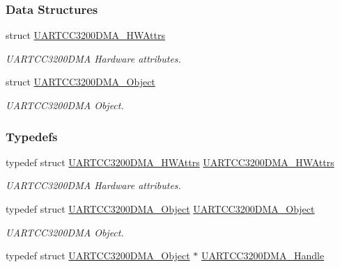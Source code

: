\subsubsection*{Data Structures}
\begin{DoxyCompactItemize}
\item 
struct \hyperlink{struct_u_a_r_t_c_c3200_d_m_a___h_w_attrs}{U\+A\+R\+T\+C\+C3200\+D\+M\+A\+\_\+\+H\+W\+Attrs}
\begin{DoxyCompactList}\small\item\em U\+A\+R\+T\+C\+C3200\+D\+M\+A Hardware attributes. \end{DoxyCompactList}\item 
struct \hyperlink{struct_u_a_r_t_c_c3200_d_m_a___object}{U\+A\+R\+T\+C\+C3200\+D\+M\+A\+\_\+\+Object}
\begin{DoxyCompactList}\small\item\em U\+A\+R\+T\+C\+C3200\+D\+M\+A Object. \end{DoxyCompactList}\end{DoxyCompactItemize}
\subsubsection*{Typedefs}
\begin{DoxyCompactItemize}
\item 
typedef struct \hyperlink{struct_u_a_r_t_c_c3200_d_m_a___h_w_attrs}{U\+A\+R\+T\+C\+C3200\+D\+M\+A\+\_\+\+H\+W\+Attrs} \hyperlink{_u_a_r_t_c_c3200_d_m_a_8h_a288a7e8d5d3c9cd0a6648e68bc375d47}{U\+A\+R\+T\+C\+C3200\+D\+M\+A\+\_\+\+H\+W\+Attrs}
\begin{DoxyCompactList}\small\item\em U\+A\+R\+T\+C\+C3200\+D\+M\+A Hardware attributes. \end{DoxyCompactList}\item 
typedef struct \hyperlink{struct_u_a_r_t_c_c3200_d_m_a___object}{U\+A\+R\+T\+C\+C3200\+D\+M\+A\+\_\+\+Object} \hyperlink{_u_a_r_t_c_c3200_d_m_a_8h_a44a53cd72c6cfa88e7d4a380d2992ff4}{U\+A\+R\+T\+C\+C3200\+D\+M\+A\+\_\+\+Object}
\begin{DoxyCompactList}\small\item\em U\+A\+R\+T\+C\+C3200\+D\+M\+A Object. \end{DoxyCompactList}\item 
typedef struct \hyperlink{struct_u_a_r_t_c_c3200_d_m_a___object}{U\+A\+R\+T\+C\+C3200\+D\+M\+A\+\_\+\+Object} $\ast$ \hyperlink{_u_a_r_t_c_c3200_d_m_a_8h_a70e67a368f2ea5e94586d886f5432d88}{U\+A\+R\+T\+C\+C3200\+D\+M\+A\+\_\+\+Handle}
\end{DoxyCompactItemize}
